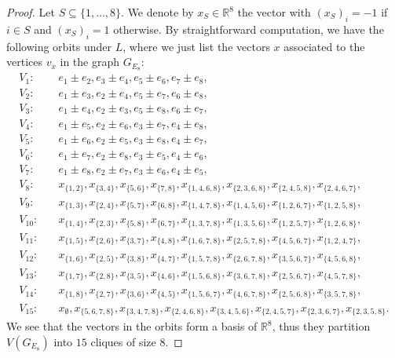 \begin{proof}
Let $S\subseteq \{1,\dots, 8\}$. We denote by $x_S\in \mathbb{R}^8$ the vector with $(x_S)_i=-1$ if $i\in S$ and $(x_S)_i=1$ otherwise. By straightforward computation, we have the following orbits under $L$, where we just list the vectors $x$ associated to the vertices $v_x$ in the graph $G_{E_8}$:
\begin{align} \label{vertexpartition}
   V_1:\quad &e_1 \pm e_2, e_3 \pm e_4, e_5 \pm e_6, e_7 \pm e_8,\\
   V_2:\quad &e_1 \pm e_3, e_2 \pm e_4, e_5 \pm e_7, e_6 \pm e_8,\nonumber\\
   V_3:\quad &e_1 \pm e_4, e_2 \pm e_3, e_5 \pm e_8, e_6 \pm e_7,\nonumber\\
   V_4:\quad &e_1 \pm e_5, e_2 \pm e_6, e_3 \pm e_7, e_4 \pm e_8,\nonumber\\
   V_5:\quad &e_1 \pm e_6, e_2 \pm e_5, e_3 \pm e_8, e_4 \pm e_7,\nonumber\\
   V_6:\quad &e_1 \pm e_7, e_2 \pm e_8, e_3 \pm e_5, e_4 \pm e_6,\nonumber\\
   V_7:\quad &e_1 \pm e_8, e_2 \pm e_7, e_3 \pm e_6, e_4 \pm e_5,\nonumber\\
   V_8:\quad &x_{\{1,2\}}, x_{\{3,4\}},x_{\{5,6\}},x_{\{7,8\}},x_{\{1,4,6,8\}}, x_{\{2,3,6,8\}},x_{\{2,4,5,8\}},x_{\{2,4,6,7\}},\nonumber\\
   V_9:\quad  &x_{\{1,3\}}, x_{\{2,4\}},x_{\{5,7\}},x_{\{6,8\}},x_{\{1,4,7,8\}}, x_{\{1,4,5,6\}},x_{\{1,2,6,7\}},x_{\{1,2,5,8\}},\nonumber\\
   V_{10}:\quad  &x_{\{1,4\}}, x_{\{2,3\}},x_{\{5,8\}},x_{\{6,7\}},x_{\{1,3,7,8\}}, x_{\{1,3,5,6\}},x_{\{1,2,5,7\}},x_{\{1,2,6,8\}},\nonumber\\
   V_{11}:\quad  &x_{\{1,5\}}, x_{\{2,6\}},x_{\{3,7\}},x_{\{4,8\}},x_{\{1,6,7,8\}}, x_{\{2,5,7,8\}},x_{\{4,5,6,7\}},x_{\{1,2,4,7\}},\nonumber\\
   V_{12}:\quad  &x_{\{1,6\}}, x_{\{2,5\}},x_{\{3,8\}},x_{\{4,7\}},x_{\{1,5,7,8\}}, x_{\{2,6,7,8\}},x_{\{3,5,6,7\}},x_{\{4,5,6,8\}},\nonumber\\
   V_{13}:\quad  &x_{\{1,7\}}, x_{\{2,8\}},x_{\{3,5\}},x_{\{4,6\}},x_{\{1,5,6,8\}}, x_{\{3,6,7,8\}},x_{\{2,5,6,7\}},x_{\{4,5,7,8\}},\nonumber\\
   V_{14}:\quad  &x_{\{1,8\}}, x_{\{2,7\}},x_{\{3,6\}},x_{\{4,5\}},x_{\{1,5,6,7\}}, x_{\{4,6,7,8\}},x_{\{2,5,6,8\}},x_{\{3,5,7,8\}},\nonumber\\
   V_{15}:\quad  &x_\emptyset, x_{\{5,6,7,8\}},x_{\{3,4,7,8\}},x_{\{2,4,6,8\}},x_{\{3,4,5,6\}}, x_{\{2,4,5,7\}},x_{\{2,3,6,7\}},x_{\{2,3,5,8\}}.\nonumber
\end{align}
We see that the vectors in the orbits form a basis of $\mathbb{R}^8$, thus they partition $V(G_{E_8})$ into $15$ cliques of size $8$.
\end{proof}

